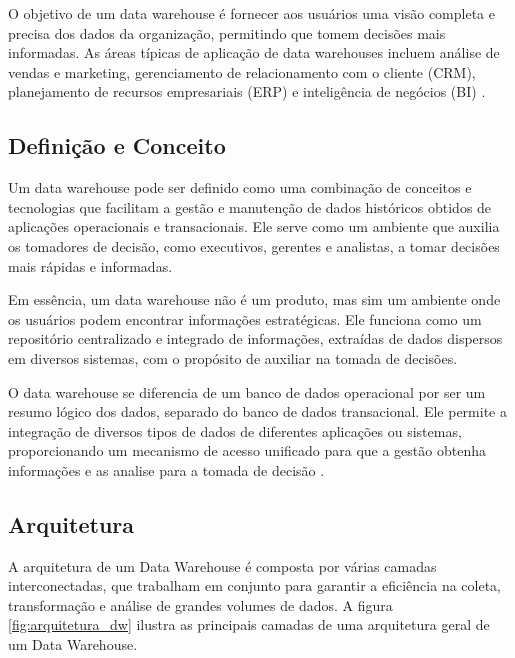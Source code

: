 O objetivo de um data warehouse é fornecer aos usuários uma visão completa e precisa dos dados da organização, permitindo 
que tomem decisões mais informadas. As áreas típicas de aplicação de data warehouses incluem análise de vendas e marketing, 
gerenciamento de relacionamento com o cliente (CRM), planejamento de recursos empresariais (ERP) e inteligência de negócios (BI) \cite{nambiar2022overview, vaisman2014data}.

\subsection{Definição e Conceito}

Um data warehouse pode ser definido como uma combinação de conceitos e tecnologias que facilitam a gestão e manutenção 
de dados históricos obtidos de aplicações operacionais e transacionais. Ele serve como um ambiente que auxilia os tomadores 
de decisão, como executivos, gerentes e analistas, a tomar decisões mais rápidas e informadas.

Em essência, um data warehouse não é um produto, mas sim um ambiente onde os usuários podem encontrar informações estratégicas. 
Ele funciona como um repositório centralizado e integrado de informações, extraídas de dados dispersos em diversos sistemas, 
com o propósito de auxiliar na tomada de decisões.

O data warehouse se diferencia de um banco de dados operacional por ser um resumo lógico dos dados, separado do banco de 
dados transacional. Ele permite a integração de diversos tipos de dados de diferentes aplicações ou sistemas, proporcionando 
um mecanismo de acesso unificado para que a gestão obtenha informações e as analise para a tomada de decisão \cite{santoso2017data}. 

\subsection{Arquitetura}
A arquitetura de um Data Warehouse é composta por várias camadas interconectadas, que trabalham em conjunto para 
garantir a eficiência na coleta, transformação e análise de grandes volumes de dados. A figura \ref{fig:arquitetura_dw} ilustra as 
principais camadas de uma arquitetura geral de um Data Warehouse.

